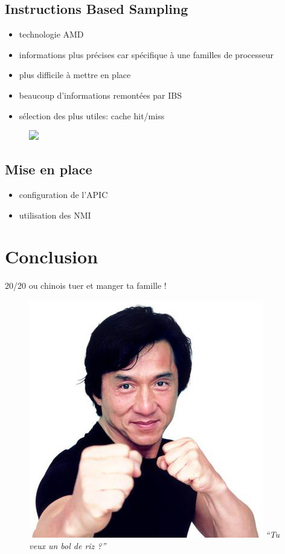 \documentclass{beamer}
\newcommand{\bframe}{\begin{frame}{\secname}{\subsecname}}
\begin{document}
    \subsection{Instructions Based Sampling}
      \bframe
        \begin{itemize}
          \item technologie AMD
          \item informations plus précises car spécifique à une familles de
            processeur
          \item plus difficile à mettre en place
        \end{itemize}
      \end{frame}

      \bframe
        \begin{itemize}
          \item<1-2> beaucoup d'informations remontées par IBS
          \item<1-2> sélection des plus utiles: cache hit/miss
        \end{itemize}
        \begin{figure}[h]
          \centering
          \includegraphics<2>[scale=0.25]{img/data3_color.png}
        \end{figure}
      \end{frame}

    \subsection{Mise en place}
      \bframe
        \begin{itemize}
          \item configuration de l'APIC
          \item utilisation des NMI
        \end{itemize}
      \end{frame}


  \section{Conclusion}
    \bframe
     20/20 ou chinois tuer et manger ta famille !
     \begin{figure}[h]
       \centering
       \includegraphics[scale=0.4]{img/jackiechan.jpg}\newline
       \textit{``Tu veux un bol de riz ?''}
     \end{figure}

    \end{frame}
\end{document}
